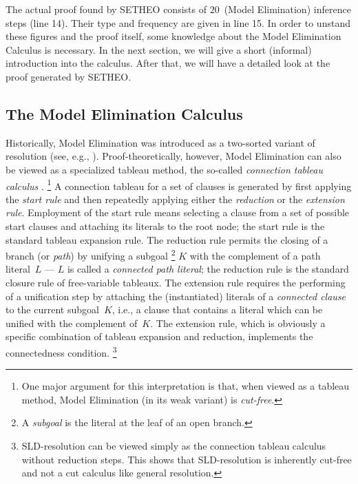 The actual proof found by SETHEO consists of $20$~(Model Elimination)
inference steps (line 14). Their type and frequency
are given in line 15.
In order to unstand these figures and the proof itself, some
knowledge about the Model Elimination Calculus is necessary.
In the next section, we will give a short (informal) introduction into
the calculus. After that, we will have a detailed look at the proof
generated by SETHEO.


\subsection{The Model Elimination Calculus}

Historically, Model Elimination was introduced as a two-sorted variant of 
resolution (see, e.g., \cite{Lov78}). 
Proof-theoretically, however, Model Elimination can also be viewed as a 
specialized tableau method, the so-called {\em connection tableau calculus\/} 
\cite{LSBB92,LMG94}.%
\footnote{One major argument for this interpretation is that, when viewed as 
a tableau method, Model Elimination (in its weak variant) is {\em cut-free}.} 
A connection tableau for a set of clauses is generated by first applying the 
{\em start rule\/} and then repeatedly applying either the
{\em reduction\/} or the {\em extension rule}.  
Employment of the start rule means selecting a clause from a set of
possible start clauses and attaching its literals to the root
node; the start rule is the standard tableau expansion rule.
The reduction rule permits the closing of a branch (or {\em path\/})
by unifying a subgoal%
\footnote{A {\em subgoal\/} is the literal at the leaf of an open branch.}
$K$ with the complement of a path literal~$L$\/ --- $L$\/ is called a {\em
connected path literal\/};
the reduction rule is the standard closure rule of free-variable tableaux. 
The extension rule requires the performing of a unification step by 
attaching the (instantiated) literals of a {\em connected clause\/}
to the current subgoal~$K$, 
i.e., a clause that contains a literal which can be unified with the complement 
of~$K$. The extension rule, which is obviously a specific combination of 
tableau expansion and reduction, implements the connectedness condition.%
\footnote{SLD-resolution can be viewed simply as the connection tableau calculus
without reduction steps. This shows that SLD-resolution is inherently cut-free
and not a cut calculus like general resolution.}

